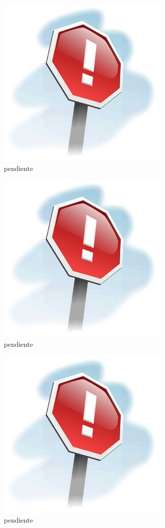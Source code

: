 \begin{figure}[ht]
	\centering
	\includegraphics[scale=.45]{./Figures/Capitulo4/pendiente.jpg}
	\caption{pendiente}
	\label{fig:figura_3}
\end{figure}
\begin{figure}[ht]
	\centering
	\includegraphics[scale=.45]{./Figures/Capitulo4/pendiente.jpg}
	\caption{pendiente}
	\label{fig:figura_f}
\end{figure}
\begin{figure}[ht]
	\centering
	\includegraphics[scale=.3]{./Figures/Capitulo4/pendiente.jpg}
	\caption{pendiente}
	\label{fig:figura_1}
\end{figure}


